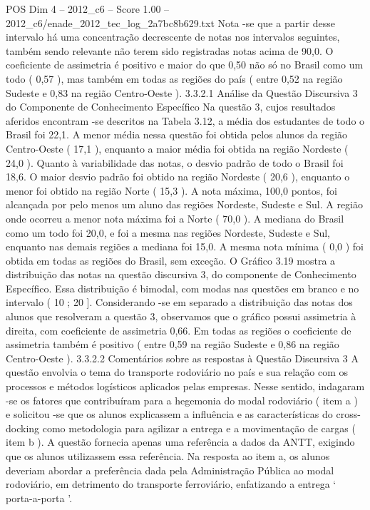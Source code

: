 \begin{textsample}{POS Dim 4 – 2012\_c6 – Score 1.00 – 2012\_c6/enade\_2012\_tec\_log\_2a7bc8b629.txt}
Nota -se que a partir desse intervalo há uma concentração decrescente de notas nos intervalos seguintes, também sendo relevante não terem sido registradas notas acima de 90,0.
O coeficiente de assimetria é positivo e maior do que 0,50 não só no Brasil como um todo ( 0,57 ), mas também em todas as regiões do país ( entre 0,52 na região Sudeste e 0,83 na região Centro-Oeste ). 3.3.2.1 Análise da Questão Discursiva 3 do Componente de Conhecimento Específico Na questão 3, cujos resultados aferidos encontram -se descritos na Tabela 3.12, a média dos estudantes de todo o Brasil foi 22,1.
A menor média nessa questão foi obtida pelos alunos da região Centro-Oeste ( 17,1 ), enquanto a maior média foi obtida na região Nordeste ( 24,0 ).
Quanto à variabilidade das notas, o desvio padrão de todo o Brasil foi 18,6.
O maior desvio padrão foi obtido na região Nordeste ( 20,6 ), enquanto o menor foi obtido na região Norte ( 15,3 ).
A nota máxima, 100,0 pontos, foi alcançada por pelo menos um aluno das regiões Nordeste, Sudeste e Sul.
A região onde ocorreu a menor nota máxima foi a Norte ( 70,0 ).
A mediana do Brasil como um todo foi 20,0, e foi a mesma nas regiões Nordeste, Sudeste e Sul, enquanto nas demais regiões a mediana foi 15,0.
A mesma nota mínima ( 0,0 ) foi obtida em todas as regiões do Brasil, sem exceção.
O Gráfico 3.19 mostra a distribuição das notas na questão discursiva 3, do componente de Conhecimento Específico.
Essa distribuição é bimodal, com modas nas questões em branco e no intervalo ( 10 ; 20 ].
Considerando -se em separado a distribuição das notas dos alunos que resolveram a questão 3, observamos que o gráfico possui assimetria à direita, com coeficiente de assimetria 0,66.
Em todas as regiões o coeficiente de assimetria também é positivo ( entre 0,59 na região Sudeste e 0,86 na região Centro-Oeste ). 3.3.2.2 Comentários sobre as respostas à Questão Discursiva 3 A questão envolvia o tema do transporte rodoviário no país e sua relação com os processos e métodos logísticos aplicados pelas empresas.
Nesse sentido, indagaram -se os fatores que contribuíram para a hegemonia do modal rodoviário ( item a ) e solicitou -se que os alunos explicassem a influência e as características do cross-docking como metodologia para agilizar a entrega e a movimentação de cargas ( item b ).
A questão fornecia apenas uma referência a dados da ANTT, exigindo que os alunos utilizassem essa referência.
Na resposta ao item a, os alunos deveriam abordar a preferência dada pela Administração Pública ao modal rodoviário, em detrimento do transporte ferroviário, enfatizando a entrega ‘ porta-a-porta ’.

\end{textsample}
